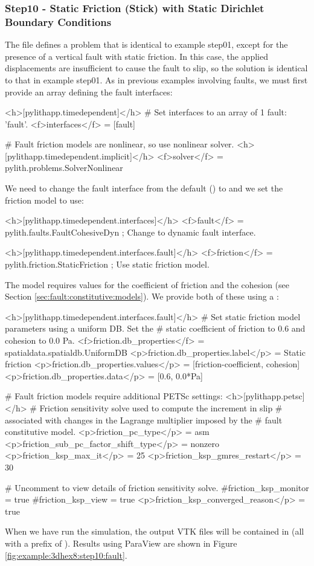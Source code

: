 \subsubsection{Step10 - Static Friction (Stick) with Static Dirichlet Boundary Conditions}

The  file defines a problem that is identical to
example step01, except for the presence of a vertical fault with static
friction. In this case, the applied displacements are insufficient
to cause the fault to slip, so the solution is identical to that in
example step01. As in previous examples involving faults, we must
first provide an array defining the fault interfaces:
\begin{cfg}
<h>[pylithapp.timedependent]</h>
# Set interfaces to an array of 1 fault: 'fault'.
<f>interfaces</f> = [fault]

# Fault friction models are nonlinear, so use nonlinear solver.
<h>[pylithapp.timedependent.implicit]</h>
<f>solver</f> = pylith.problems.SolverNonlinear
\end{cfg}
We need to change the fault interface from the default ()
to  and we set the friction model to use:
\begin{cfg}
<h>[pylithapp.timedependent.interfaces]</h>
<f>fault</f> = pylith.faults.FaultCohesiveDyn ; Change to dynamic fault interface.

<h>[pylithapp.timedependent.interfaces.fault]</h>
<f>friction</f> = pylith.friction.StaticFriction ; Use static friction model.
\end{cfg}
The  model requires values for the coefficient
of friction and the cohesion (see Section \vref{sec:fault:constitutive:models}).
We provide both of these using a :
\begin{cfg}
<h>[pylithapp.timedependent.interfaces.fault]</h>
# Set static friction model parameters using a uniform DB. Set the
# static coefficient of friction to 0.6 and cohesion to 0.0 Pa.
<f>friction.db_properties</f> = spatialdata.spatialdb.UniformDB
<p>friction.db_properties.label</p> = Static friction
<p>friction.db_properties.values</p> = [friction-coefficient, cohesion]
<p>friction.db_properties.data</p> = [0.6, 0.0*Pa]

# Fault friction models require additional PETSc settings:
<h>[pylithapp.petsc]</h>
# Friction sensitivity solve used to compute the increment in slip
# associated with changes in the Lagrange multiplier imposed by the
# fault constitutive model.
<p>friction_pc_type</p> = asm
<p>friction_sub_pc_factor_shift_type</p> = nonzero
<p>friction_ksp_max_it</p> = 25
<p>friction_ksp_gmres_restart</p> = 30

# Uncomment to view details of friction sensitivity solve.
#friction_ksp_monitor = true
#friction_ksp_view = true
<p>friction_ksp_converged_reason</p> = true
\end{cfg}
When we have run the simulation, the output VTK files will be contained
in  (all with a prefix of ).
Results using ParaView are shown in Figure \vref{fig:example:3dhex8:step10:fault}.

